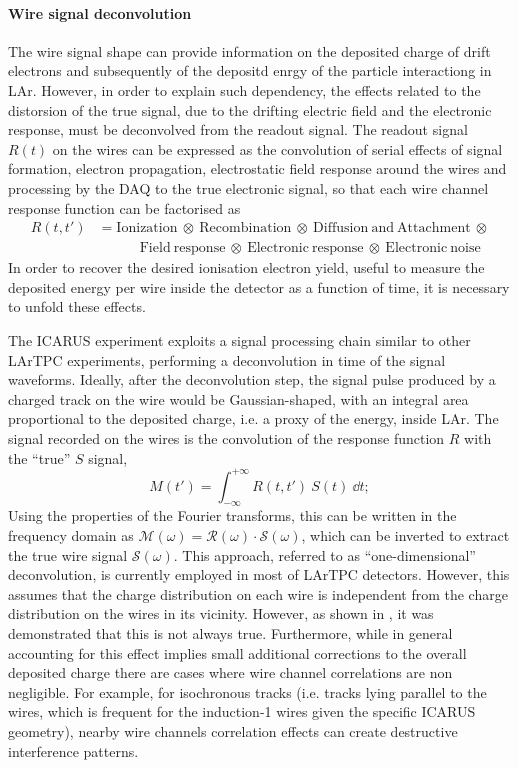 \paragraph{Wire signal deconvolution} The wire signal shape can provide information on the deposited charge of drift electrons and subsequently of the depositd enrgy of the particle interactiong in LAr. However, in order to explain such dependency, the effects related to the distorsion of the true signal, due to the drifting electric field and the electronic response, must be deconvolved from the readout signal. The readout signal $R(t)$ on the wires can be expressed as the convolution of serial effects of signal formation, electron propagation, electrostatic field response around the wires and processing by the DAQ to the true electronic signal, so that each wire channel response function can be factorised as \begin{equation}
    \begin{aligned}
        R(t, t')&=\mathrm{Ionization\ \otimes\ Recombination\ \otimes\ Diffusion\ and\ Attachment\ \otimes} \\
        &\quad \quad \quad \mathrm{Field\ response\ \otimes\ Electronic\ response\ \otimes\ Electronic\ noise}
    \end{aligned} 
\end{equation} In order to recover the desired ionisation electron yield, useful to measure the deposited energy per wire inside the detector as a function of time, it is necessary to unfold these effects. 

The ICARUS experiment exploits a signal processing chain similar to other LArTPC experiments, performing a deconvolution in time of the signal waveforms. Ideally, after the deconvolution step, the signal pulse produced by a charged track on the wire would be Gaussian-shaped, with an integral area proportional to the deposited charge, i.e. a proxy of the energy, inside LAr. The signal recorded on the wires is the convolution of the response function $R$ with the ``true'' $S$ signal, \begin{equation}
    M(t') = \int_{-\infty}^{+\infty} R(t,t')\ S(t)\ \dd t;
\end{equation} Using the properties of the Fourier transforms, this can be written in the frequency domain as $\mathcal M(\omega) = \mathcal R(\omega)\cdot \mathcal S(\omega)$, which can be inverted to extract the true wire signal $\mathcal S(\omega)$. This approach, referred to as ``one-dimensional'' deconvolution, is currently employed in most of LArTPC detectors. However, this assumes that the charge distribution on each wire is independent from the charge distribution on the wires in its vicinity. However, as shown in \cite{MicroBooNE:2018swd,MicroBooNE:2018vro}, it was demonstrated that this is not always true. Furthermore, while in general accounting for this effect implies small additional corrections to the overall deposited charge there are cases where wire channel correlations are non negligible. For example, for isochronous tracks (i.e. tracks lying parallel to the wires, which is frequent for the induction-1 wires given the specific ICARUS geometry), nearby wire channels correlation effects can create destructive interference patterns.

